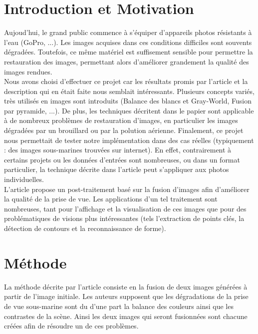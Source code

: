 \documentclass[twoside]{article}
\begin{document}
\begin{multicols}{2} %

\section{Introduction et Motivation}
Aujoud'hui, le grand public commence à s'équiper d'appareils photos résistants à l'eau (GoPro, ...). Les images acquises dans ces conditions difficiles sont souvents dégradées. Toutefois, ce même matériel est suffisement sensible pour permettre la restauration des images, permettant alors d'améliorer grandement la qualité des images rendues.\\
Nous avons choisi d'effectuer ce projet car les résultats promis par l'article et la description qui en était faite nous semblait intéressants. Plusieurs concepts variés, très utilisés en images sont introduits (Balance des blancs et Gray-World, Fusion par pyramide, ...). De plus, les techniques décritent dans le papier sont applicable à de nombreux problèmes de restauration d'images, en particulier les images dégradées par un brouillard ou par la polution aérienne. Finalement, ce projet nous permettait de tester notre implémentation dans des cas réelles (typiquement : des images sous-marines trouvées sur internet). En effet, contrairement à certains projets ou les données d'entrées sont nombreuses, ou dans un format particulier, la technique décrite dans l'article peut s'appliquer aux photos individuelles.\\
L’article propose un post-traitement basé sur la fusion d’images afin d’améliorer la qualité de la prise de vue. Les applications d’un tel traitement sont nombreuses, tant pour l’affichage et la visualisation de ces images que pour des problématiques de visions plus intéressantes (tels l’extraction de points clés, la détection de contours et la reconnaissance de forme).\\


\section{Méthode}

La méthode décrite par l’article consiste en la fusion de deux images générées à partir de l’image initiale. Les auteurs supposent que les dégradations de la prise de vue sous-marine sont du d’une part la balance des couleurs ainsi que les contrastes de la scène. Ainsi les deux images qui seront fusionnées sont chacune créées afin de résoudre un de ces problèmes.\\


\end{multicols}
\end{document}
